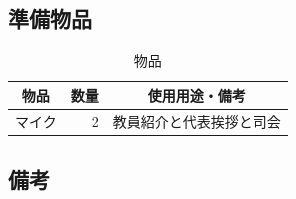 \subsection{準備物品}
\begin{table}[h]
  \centering
  \caption{物品}
  \begin{tabular}{lrl}
    \hline
    \multicolumn{1}{c}{物品} & \multicolumn{1}{c}{数量} & \multicolumn{1}{c}{使用用途・備考} \\
    \hline
    マイク & 2 & 教員紹介と代表挨拶と司会 \\
    \hline  
  \end{tabular}
\end{table}

\subsection{備考}
